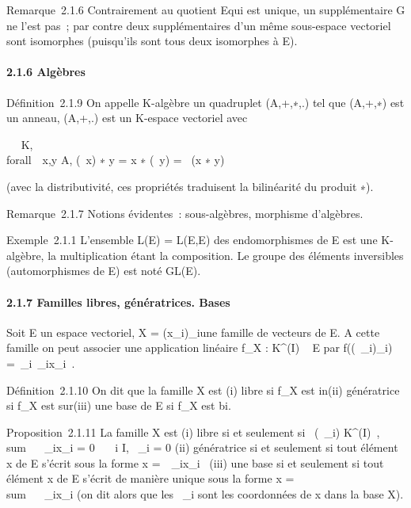 \documentclass[]{article}
\begin{document}
Remarque~2.1.6 Contrairement au quotient E\diagupF qui est unique, un
supplémentaire G ne l'est pas~; par contre deux supplémentaires d'un
même sous-espace vectoriel sont isomorphes (puisqu'ils sont tous deux
isomorphes à E\diagupF).

\paragraph{2.1.6 Algèbres}

Définition~2.1.9 On appelle K-algèbre un quadruplet (A,+,∗,.) tel que
(A,+,∗) est un anneau, (A,+,.) est un K-espace vectoriel avec

\forall~\lambda~ \in K, \\forall~~x,y \in A,
(\lambda~x) ∗ y = x ∗ (\lambda~y) = \lambda~(x ∗ y)

(avec la distributivité, ces propriétés traduisent la bilinéarité du
produit ∗).

Remarque~2.1.7 Notions évidentes~: sous-algèbres, morphisme d'algèbres.

Exemple~2.1.1 L'ensemble L(E) = L(E,E) des endomorphismes de E est une
K-algèbre, la multiplication étant la composition. Le groupe des
éléments inversibles (automorphismes de E) est noté GL(E).

\paragraph{2.1.7 Familles libres, génératrices. Bases}

Soit E un espace vectoriel, X = (x\_i)\_i\inI une famille
de vecteurs de E. A cette famille on peut associer une application
linéaire f\_X : K^(I) \rightarrow~ E par
f((\alpha~\_i)\_i\inI) =\
\sum  \_i\inI\alpha~\_ix\_i~.

Définition~2.1.10 On dit que la famille X est (i) libre si f\_X
est in\jmathective (ii) génératrice si f\_X est sur\jmathective (iii) une
base de E si f\_X est bi\jmathective.

Proposition~2.1.11 La famille X est (i) libre si et seulement si
\forall~(\alpha~\_i) \in K^(I)~,
\\sum ~
\alpha~\_ix\_i = 0 \rigtharrow~\forall~~i \in I,
\alpha~\_i = 0 (ii) génératrice si et seulement si tout élément x de E
s'écrit sous la forme x =\
\sum  \alpha~\_ix\_i~ (iii) une base
si et seulement si tout élément x de E s'écrit de manière unique sous la
forme x = \\sum ~
\alpha~\_ix\_i (on dit alors que les \alpha~\_i sont les
coordonnées de x dans la base X).
\end{document}
